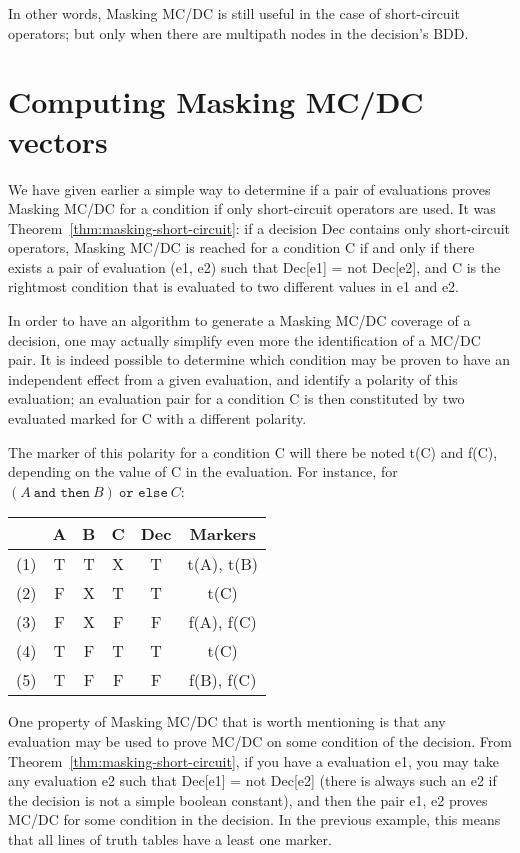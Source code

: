 \documentclass[a4paper,12pt,twoside]{article}
\newcommand{\andthen}{\texttt{and then}}
\newcommand{\orelse}{\texttt{or else}}
\begin{document}
In other words, Masking MC/DC is still useful in the case of
short-circuit operators; but only when there are multipath nodes in the
decision's BDD.

\section{Computing Masking MC/DC vectors}

We have given earlier a simple way to determine if a pair of
evaluations proves Masking MC/DC for a condition if only short-circuit
operators are used. It was Theorem~\ref{thm:masking-short-circuit}: if
a decision Dec contains only short-circuit operators, Masking MC/DC is
reached for a condition C if and only if there exists a pair of
evaluation (e1, e2) such that Dec[e1] = not Dec[e2], and C is the
rightmost condition that is evaluated to two different values in e1
and e2.

In order to have an algorithm to generate a Masking MC/DC coverage of
a decision, one may actually simplify even more the identification of
a MC/DC pair. It is indeed possible to determine which condition may
be proven to have an independent effect from a given evaluation, and
identify a polarity of this evaluation; an evaluation pair for a
condition C is then constituted by two evaluated marked for C with a
different polarity.

The marker of this polarity for a condition C will there be noted t(C)
and f(C), depending on the value of C in the evaluation. For instance,
for $(A \ \andthen{} \ B) \ \orelse{} \ C$:

\begin{center}
\begin{tabular}{|c|c|c|c||c||c|}
\hline
    & A & B & C & Dec & Markers   \\ \hline
(1) & T & T & X & T   & t(A), t(B)\\ \hline
(2) & F & X & T & T   & t(C)      \\ \hline
(3) & F & X & F & F   & f(A), f(C)\\ \hline
(4) & T & F & T & T   & t(C)      \\ \hline
(5) & T & F & F & F   & f(B), f(C)\\ \hline
\end{tabular}
\end{center}

One property of Masking MC/DC that is worth mentioning is that any
evaluation may be used to prove MC/DC on some condition of the
decision. From Theorem~\ref{thm:masking-short-circuit}, if you have a
evaluation e1, you may take any evaluation e2 such that Dec[e1] = not
Dec[e2] (there is always such an e2 if the decision is not a simple
boolean constant), and then the pair {e1, e2} proves MC/DC for some
condition in the decision. In the previous example, this means that
all lines of truth tables have a least one marker.
\end{document}
